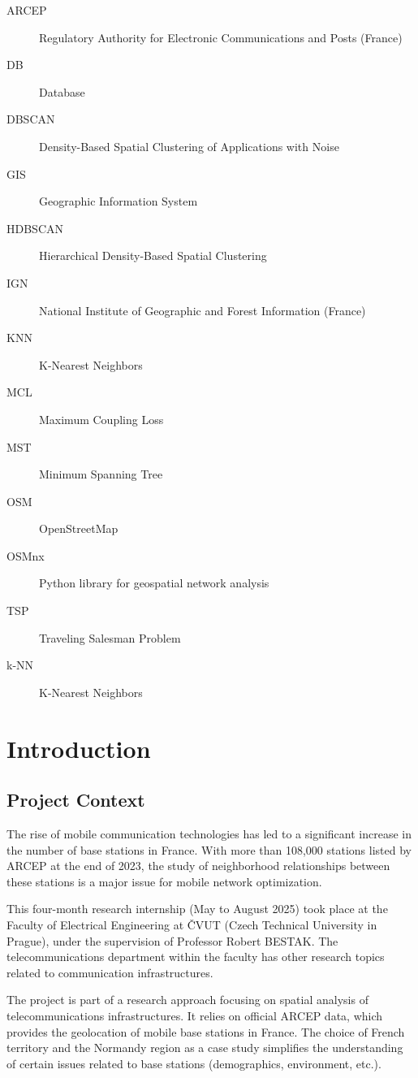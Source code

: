 \documentclass[12pt,a4paper]{report}
\begin{document}
\begin{description}
    \item[ARCEP] Regulatory Authority for Electronic Communications and Posts (France)
    \item[DB] Database
    \item[DBSCAN] Density-Based Spatial Clustering of Applications with Noise
    \item[GIS] Geographic Information System
    \item[HDBSCAN] Hierarchical Density-Based Spatial Clustering
    \item[IGN] National Institute of Geographic and Forest Information (France)
    \item[KNN] K-Nearest Neighbors
    \item[MCL] Maximum Coupling Loss
    \item[MST] Minimum Spanning Tree
    \item[OSM] OpenStreetMap
    \item[OSMnx] Python library for geospatial network analysis
    \item[TSP] Traveling Salesman Problem
    \item[k-NN] K-Nearest Neighbors
\end{description}

\newpage

\chapter{Introduction}

\section{Project Context}

The rise of mobile communication technologies has led to a significant increase in the number of base stations in France. With more than 108,000 stations listed by ARCEP at the end of 2023, the study of neighborhood relationships between these stations is a major issue for mobile network optimization.

This four-month research internship (May to August 2025) took place at the Faculty of Electrical Engineering at ČVUT (Czech Technical University in Prague), under the supervision of Professor Robert BESTAK. The telecommunications department within the faculty has other research topics related to communication infrastructures.

The project is part of a research approach focusing on spatial analysis of telecommunications infrastructures. It relies on official ARCEP data, which provides the geolocation of mobile base stations in France. The choice of French territory and the Normandy region as a case study simplifies the understanding of certain issues related to base stations (demographics, environment, etc.).
\end{document}
